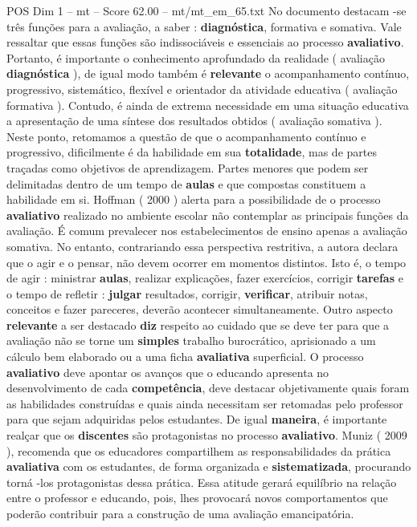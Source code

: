 \begin{textsample}{POS Dim 1 – mt – Score 62.00 – mt/mt\_em\_65.txt}
No documento destacam -se três funções para a avaliação, a saber : \textbf{diagnóstica}, formativa e somativa.
Vale ressaltar que essas funções são indissociáveis e essenciais ao processo \textbf{avaliativo}.
Portanto, é importante o conhecimento aprofundado da realidade ( avaliação \textbf{diagnóstica} ), de igual modo também é \textbf{relevante} o acompanhamento contínuo, progressivo, sistemático, flexível e orientador da atividade educativa ( avaliação formativa ).
Contudo, é ainda de extrema necessidade em uma situação educativa a apresentação de uma síntese dos resultados obtidos ( avaliação somativa ).
Neste ponto, retomamos a questão de que o acompanhamento contínuo e progressivo, dificilmente é da habilidade em sua \textbf{totalidade}, mas de partes traçadas como objetivos de aprendizagem.
Partes menores que podem ser delimitadas dentro de um tempo de \textbf{aulas} e que compostas constituem a habilidade em si.
Hoffman ( 2000 ) alerta para a possibilidade de o processo \textbf{avaliativo} realizado no ambiente escolar não contemplar as principais funções da avaliação.
É comum prevalecer nos estabelecimentos de ensino apenas a avaliação somativa.
No entanto, contrariando essa perspectiva restritiva, a autora declara que o agir e o pensar, não devem ocorrer em momentos distintos.
Isto é, o tempo de agir : ministrar \textbf{aulas}, realizar explicações, fazer exercícios, corrigir \textbf{tarefas} e o tempo de refletir : \textbf{julgar} resultados, corrigir, \textbf{verificar}, atribuir notas, conceitos e fazer pareceres, deverão acontecer simultaneamente.
Outro aspecto \textbf{relevante} a ser destacado \textbf{diz} respeito ao cuidado que se deve ter para que a avaliação não se torne um \textbf{simples} trabalho burocrático, aprisionado a um cálculo bem elaborado ou a uma ficha \textbf{avaliativa} superficial.
O processo \textbf{avaliativo} deve apontar os avanços que o educando apresenta no desenvolvimento de cada \textbf{competência}, deve destacar objetivamente quais foram as habilidades construídas e quais ainda necessitam ser retomadas pelo professor para que sejam adquiridas pelos estudantes.
De igual \textbf{maneira}, é importante realçar que os \textbf{discentes} são protagonistas no processo \textbf{avaliativo}.
Muniz ( 2009 ), recomenda que os educadores compartilhem as responsabilidades da prática \textbf{avaliativa} com os estudantes, de forma organizada e \textbf{sistematizada}, procurando torná -los protagonistas dessa prática.
Essa atitude gerará equilíbrio na relação entre o professor e educando, pois, lhes provocará novos comportamentos que poderão contribuir para a construção de uma avaliação emancipatória.

\end{textsample}
